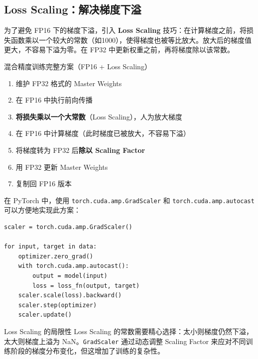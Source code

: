 \documentclass[a4paper]{article}
\begin{document}
\subsection{Loss Scaling：解决梯度下溢}

为了避免 FP16 下的梯度下溢，引入 \textbf{Loss Scaling} 技巧：在计算梯度之前，将损失函数乘以一个较大的常数（如1000），使得梯度也被等比放大。放大后的梯度值更大，不容易下溢为零。在 FP32 中更新权重之前，再将梯度除以该常数。





\begin{importantbox}{混合精度训练完整方案（FP16 + Loss Scaling）}
\begin{enumerate}
    \item 维护 FP32 格式的 Master Weights
    \item 在 FP16 中执行前向传播
    \item \textbf{将损失乘以一个大常数}（Loss Scaling），人为放大梯度
    \item 在 FP16 中计算梯度（此时梯度已被放大，不容易下溢）
    \item 将梯度转为 FP32 后\textbf{除以 Scaling Factor}
    \item 用 FP32 更新 Master Weights
    \item 复制回 FP16 版本
\end{enumerate}
\end{importantbox}

在 PyTorch 中，使用 \texttt{torch.cuda.amp.GradScaler} 和 \texttt{torch.cuda.amp.autocast} 可以方便地实现此方案：

\begin{lstlisting}[caption={PyTorch 中的 FP16 混合精度训练（含 GradScaler）}]
scaler = torch.cuda.amp.GradScaler()

for input, target in data:
    optimizer.zero_grad()
    with torch.cuda.amp.autocast():
        output = model(input)
        loss = loss_fn(output, target)
    scaler.scale(loss).backward()
    scaler.step(optimizer)
    scaler.update()
\end{lstlisting}

\begin{warningbox}{Loss Scaling 的局限性}
Loss Scaling 的常数需要精心选择：太小则梯度仍然下溢，太大则梯度上溢为 NaN。\texttt{GradScaler} 通过动态调整 Scaling Factor 来应对不同训练阶段的梯度分布变化，但这增加了训练的复杂性。
\end{warningbox}
\end{document}
